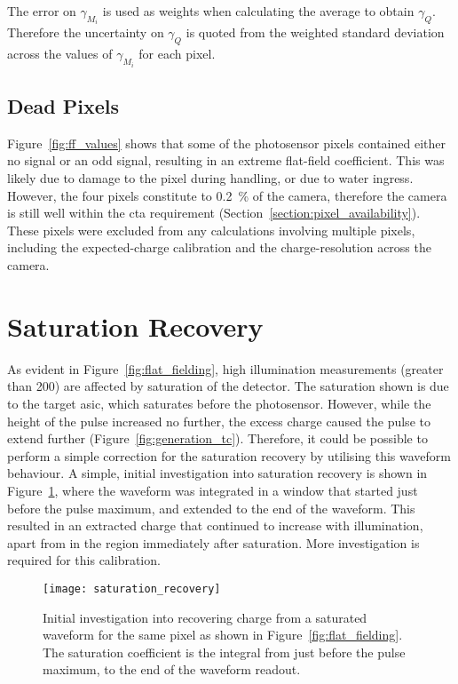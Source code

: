 The error on $\gamma_{M_i}$ is used as weights when calculating the average to obtain $\gamma_Q$. Therefore the uncertainty on $\gamma_Q$ is quoted from the weighted standard deviation across the values of $\gamma_{M_i}$ for each pixel.

\subsection{Dead Pixels}

Figure~\ref{fig:ff_values} shows that some of the photosensor pixels contained either no signal or an odd signal, resulting in an extreme flat-field coefficient. This was likely due to damage to the pixel during handling, or due to water ingress. However, the four pixels constitute to \SI{0.2}{\percent} of the camera, therefore the camera is still well within the  \gls{cta} requirement (Section~\ref{section:pixel_availability}). These pixels were excluded from any calculations involving multiple pixels, including the expected-charge calibration and the charge-resolution across the camera. 

\section{Saturation Recovery} \label{section:saturation}

As evident in Figure~\ref{fig:flat_fielding}, high illumination measurements (greater than \utilde\SI{200}{\pe}) are affected by saturation of the detector. The saturation shown is due to the \gls{target} \gls{asic}, which saturates before the photosensor. However, while the height of the pulse increased no further, the excess charge caused the pulse to extend further (Figure~\ref{fig:generation_tc}). Therefore, it could be possible to perform a simple correction for the saturation recovery by utilising this waveform behaviour. A simple, initial investigation into saturation recovery is shown in Figure~\ref{fig:saturation_recovery}, where the waveform was integrated in a window that started just before the pulse maximum, and extended to the end of the waveform. This resulted in an extracted charge that continued to increase with illumination, apart from in the region immediately after saturation. More investigation is required for this calibration.

\begin{figure}[H]
	\centering
    \texttt{[image: saturation\_recovery]} 
	\caption[Saturation Recovery.]{Initial investigation into recovering charge from a saturated waveform for the same pixel as shown in Figure~\ref{fig:flat_fielding}. The saturation coefficient is the integral from just before the pulse maximum, to the end of the waveform readout.}
	\label{fig:saturation_recovery}
\end{figure}

